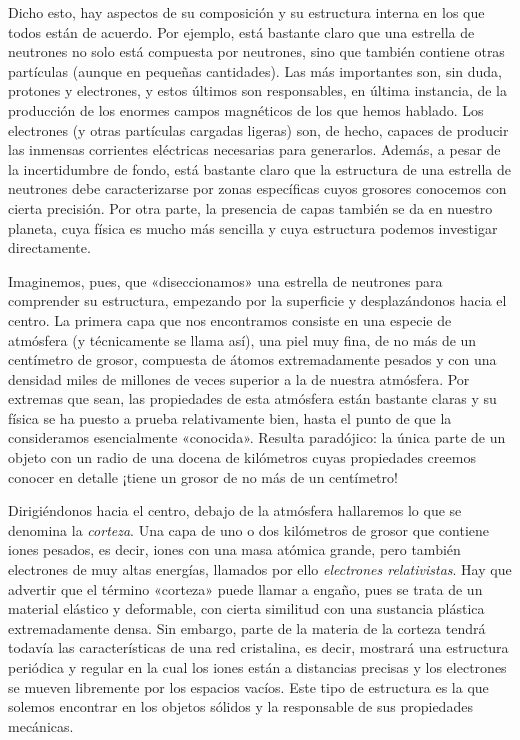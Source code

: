 Dicho esto, hay aspectos de su composición y su estructura interna en los que todos están de acuerdo. Por ejemplo, está bastante claro que una estrella de neutrones no solo está compuesta por neutrones, sino que también contiene otras partículas (aunque en pequeñas cantidades). Las más importantes son, sin duda, protones y electrones, y estos últimos son responsables, en última instancia, de la producción de los enormes campos magnéticos de los que hemos hablado. Los electrones (y otras partículas cargadas ligeras) son, de hecho, capaces de producir las inmensas corrientes eléctricas necesarias para generarlos. Además, a pesar de la incertidumbre de fondo, está bastante claro que la estructura de una estrella de neutrones debe caracterizarse por zonas específicas cuyos grosores conocemos con cierta precisión. Por otra parte, la presencia de capas también se da en nuestro planeta, cuya física es mucho más sencilla y cuya estructura podemos investigar directamente.

Imaginemos, pues, que «diseccionamos» una estrella de neutrones para comprender su estructura, empezando por la superficie y desplazándonos hacia el centro. La primera capa que nos encontramos consiste en una especie de atmósfera (y técnicamente se llama así), una piel muy fina, de no más de un centímetro de grosor, compuesta de átomos extremadamente pesados y con una densidad miles de millones de veces superior a la de nuestra atmósfera. Por extremas que sean, las propiedades de esta atmósfera están bastante claras y su física se ha puesto a prueba relativamente bien, hasta el punto de que la consideramos esencialmente «conocida». Resulta paradójico: la única parte de un objeto con un radio de una docena de kilómetros cuyas propiedades creemos conocer en detalle ¡tiene un grosor de no más de un centímetro!

Dirigiéndonos hacia el centro, debajo de la atmósfera hallaremos lo que se denomina la \emph{corteza}. Una capa de uno o dos kilómetros de grosor que contiene iones pesados, es decir, iones con una masa atómica grande, pero también electrones de muy altas energías, llamados por ello \emph{electrones relativistas}. Hay que advertir que el término «corteza» puede llamar a engaño, pues se trata de un material elástico y deformable, con cierta similitud con una sustancia plástica extremadamente densa. Sin embargo, parte de la materia de la corteza tendrá todavía las características de una red cristalina, es decir, mostrará una estructura periódica y regular en la cual los iones están a distancias precisas y los electrones se mueven libremente por los espacios vacíos. Este tipo de estructura es la que solemos encontrar en los objetos sólidos y la responsable de sus propiedades mecánicas.

